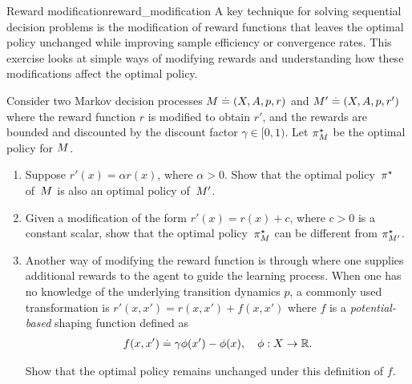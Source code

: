 \begin{nexercise}{Reward modification}{reward_modification}
  A key technique for solving sequential decision problems is the modification of reward functions that leaves the optimal policy unchanged while improving sample efficiency or convergence rates.
  This exercise looks at simple ways of modifying rewards and understanding how these modifications affect the optimal policy.

  Consider two Markov decision processes $M \overset{.}{=} (X, A, p, r)$ and ${M' \overset{.}{=} (X, A, p, r')}$ where the reward function $r$ is modified to obtain $r'$, and the rewards are bounded and discounted by the discount factor ${\gamma \in [0,1)}$.
  Let $\pi^\star_M$ be the optimal policy for $M$.

  \begin{enumerate}
    \item Suppose $r'(x) = \alpha r(x)$, where $\alpha > 0$. Show that the optimal policy~$\pi^\star$ of~$M$ is also an optimal policy of~$M'$.
    \item Given a modification of the form $r'(x) = r(x) + c$, where $c > 0$ is a constant scalar, show that the optimal policy~$\pi^\star_M$ can be different from $\pi^\star_{M'}$.
    \item Another way of modifying the reward function is through  where one supplies additional rewards to the agent to guide the learning process.
    When one has no knowledge of the underlying transition dynamics $p$, a commonly used transformation is ${r'(x, x') = r(x, x') + f(x, x')}$ where $f$ is a \emph{potential-based} shaping function defined as \begin{align}
      f(x, x') \overset{.}{=} \gamma \phi(x') - \phi(x), \quad \phi : X \to \mathbb{R}.
    \end{align}

    Show that the optimal policy remains unchanged under this definition of $f$.
  \end{enumerate}
\end{nexercise}

